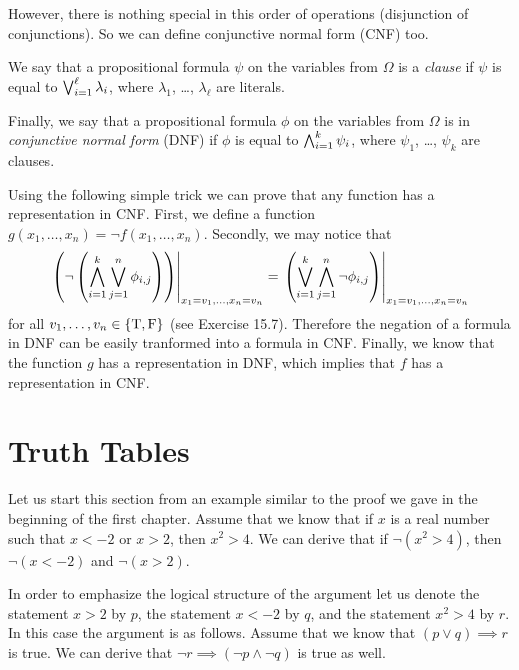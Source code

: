 However, there is nothing special in this order of operations (disjunction of
conjunctions). So we can define conjunctive normal form (CNF) too.
\begin{definition}
  We say that a propositional formula $\psi$ on the variables from $\Omega$ is
  a \emph{clause} if $\psi$ is equal to $\bigvee_{i = 1}^\ell \lambda_i$, where
  $\lambda_1$, \dots, $\lambda_\ell$ are literals.

  Finally, we say that a propositional formula $\phi$ on the variables from
  $\Omega$ is in \emph{conjunctive normal form} (DNF) if $\phi$ is equal to
  $\bigwedge_{i = 1}^k \psi_i$, where $\psi_1$, \dots, $\psi_k$ are
  clauses.
\end{definition}

Using the following simple trick we can prove that any function
has a representation in CNF. First, we define a function
$g(x_1, \dots, x_n) = \lnot f(x_1, \dots, x_n)$. Secondly, we may notice that
\[
  \left. {
    \left(
      \lnot
      \left(
        \bigwedge_{i = 1}^k \bigvee_{j = 1}^n \phi_{i, j}
      \right)
    \right)
  } \right\rvert_{x_1 = v_1, \dots, x_n = v_n}
  =
  \left. {
    \left(
      \bigvee_{i = 1}^k \bigwedge_{j = 1}^n \lnot \phi_{i, j}
    \right)
  } \right\rvert_{x_1 = v_1, \dots, x_n = v_n}
\]
for all $v_1, \dots, v_n \in \set{\ltrue, \lfalse}$
(see Exercise 15.7). Therefore the negation
of a formula in DNF can be easily tranformed into a formula in CNF.
Finally, we know that the function
$g$ has a representation in DNF, which implies that $f$ has a representation
in CNF.

\section{Truth Tables}
\label{section:truth-tables}

Let us start this section from an example similar to
the proof we gave in the beginning of the first chapter. Assume that we know
that if $x$ is a real number such that $x < -2$ or $x > 2$, then $x^2 > 4$. We
can derive that if $\lnot (x^2 > 4)$, then $\lnot (x < -2)$ and $\lnot (x > 2)$.

In order to emphasize the logical structure of the argument let us denote
the statement $x > 2$ by $p$, the statement $x < -2$ by $q$, and the statement
$x^2 > 4$ by $r$. In this case the argument is as follows.
Assume that we know that $(p \lor q) \implies r$ is true. We
can derive that $\lnot r \implies (\lnot p \land \lnot q)$ is true as well.

